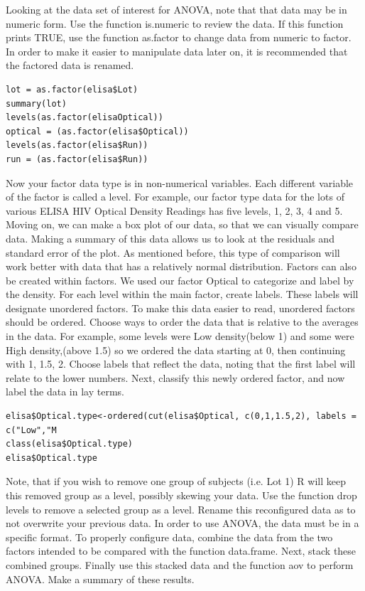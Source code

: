 Looking at the data set of interest for ANOVA, note that that data may be in numeric form. Use the function is.numeric to review the data. If this function prints TRUE, use the function as.factor to change data from numeric to factor. In order to make it easier to manipulate data later on, it is recommended that the factored data is renamed. 
\begin{lstlisting}
lot = as.factor(elisa$Lot)
summary(lot)
levels(as.factor(elisaOptical))
optical = (as.factor(elisa$Optical))
levels(as.factor(elisa$Run))
run = (as.factor(elisa$Run))
\end{lstlisting}
Now your factor data type is in non-numerical variables.
Each different variable of the factor is called a level.
For example, our factor type data for the lots of various ELISA HIV Optical Density Readings has five levels, 1, 2, 3, 4 and 5.
Moving on, we can make a box plot of our data, so that we can visually compare data.
Making a summary of this data allows us to look at the residuals and standard error of the plot.
As mentioned before, this type of comparison will work better with data that has a relatively normal distribution. 
Factors can also be created within factors.
We used our factor Optical to categorize and label by the density.
For each level within the main factor, create labels.
These labels will designate unordered factors.
To make this data easier to read, unordered factors should be ordered.
Choose ways to order the data that is relative to the averages in the data.
For example, some levels were Low density(below 1) and some were High density,(above 1.5) so we ordered the data starting at 0, then continuing with 1, 1.5, 2. Choose labels that reflect the data, noting that the first label will relate to the lower numbers.
Next, classify this newly ordered factor, and now label the data in lay terms. 
\begin{lstlisting}
elisa$Optical.type<-ordered(cut(elisa$Optical, c(0,1,1.5,2), labels = c("Low","M
class(elisa$Optical.type)
elisa$Optical.type
\end{lstlisting}
Note, that if you wish to remove one group of subjects (i.e. Lot 1) R will keep this removed group as a level, possibly skewing your data. Use the function drop levels to remove a selected group as a level. Rename this reconfigured data as to not overwrite your previous data. 
In order to use ANOVA, the data must be in a specific format. To properly configure data, combine the data from the two factors intended to be compared with the function data.frame. Next, stack these combined groups. Finally use this stacked data and the function aov to perform ANOVA. Make a summary of these results.
